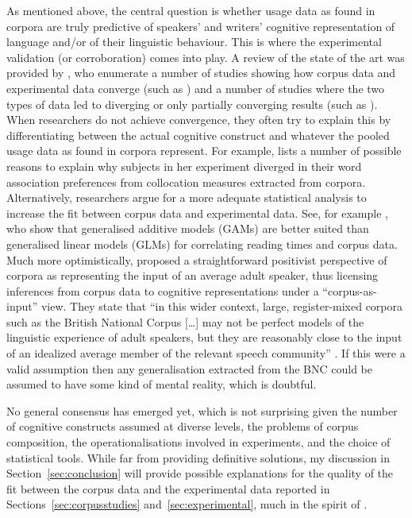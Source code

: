 As mentioned above, the central question is whether usage data as found in corpora are truly predictive of speakers' and writers' cognitive representation of language and\slash or of their linguistic behaviour.
This is where the experimental validation (or corroboration) comes into play.
A review of the state of the art was provided by \cite{NewmanSorensenduncan2015}, who enumerate a number of studies showing how corpus data and experimental data converge (such as \citealp{BresnanEa2007,DurrantDoherty2010,GriesWulff2005,GriesEa2005}) and a number of studies where the two types of data led to diverging or only partially converging results (such as \citealp{ArppeJaervikivi2007,Dabrowska2014,Mollin2009}).
When researchers do not achieve convergence, they often try to explain this by differentiating between the actual cognitive construct and whatever the pooled usage data as found in corpora represent.
For example, \citet[411]{Dabrowska2014} lists a number of possible reasons to explain why subjects in her experiment diverged in their word association preferences from collocation measures extracted from corpora.
Alternatively, researchers argue for a more adequate statistical analysis to increase the fit between corpus data and experimental data.
See, for example \cite{DivjakEa2016}, who show that generalised additive models (GAMs) are better suited than generalised linear models (GLMs) for correlating reading times and corpus data. 
Much more optimistically, \cite{StefanowitschFlach2016} proposed a straightforward positivist perspective of corpora as representing the input of an average adult speaker, thus licensing inferences from corpus data to cognitive representations under a ``corpus-as-input'' view.
They state that ``in this wider context, large, register-mixed corpora such as the British National Corpus [\ldots] may not be perfect models of the linguistic experience of adult speakers, but they are reasonably close to the input of an idealized average member of the relevant speech community'' \citep[104]{StefanowitschFlach2016}.
If this were a valid assumption then any generalisation extracted from the BNC could be assumed to have some kind of mental reality, which is doubtful.

No general consensus has emerged yet, which is not surprising given the number of cognitive constructs assumed at diverse levels, the problems of corpus composition, the operationalisations involved in experiments, and the choice of statistical tools.
While far from providing definitive solutions, my discussion in Section~\ref{sec:conclusion} will provide possible explanations for the quality of the fit between the corpus data and the experimental data reported in Sections~\ref{sec:corpusstudies} and~\ref{sec:experimental}, much in the spirit of \citet{Dabrowska2014}.

